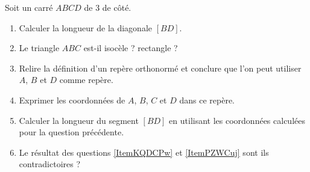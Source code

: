 
\begin{exercice}\label{exoSeconde-0085}

    Soit un carré \( ABCD\) de \unit{3}{\centi\meter} de côté.
    \begin{enumerate}
        \item   \label{ItemKQDCPw}
            Calculer la longueur de la diagonale \( [BD]\).
        \item
            Le triangle \( ABC\) est-il isocèle ? rectangle ?
        \item
            Relire la définition d'un repère orthonormé et conclure que l'on peut utiliser \( A\), \( B\) et \( D\) comme repère.
        \item
            Exprimer les coordonnées de \( A\), \( B\), \( C\) et \( D\) dans ce repère.
        \item   \label{ItemPZWCuj}
            Calculer la longueur du segment \( [BD]\) en utilisant les coordonnées calculées pour la question précédente.
        \item
            Le résultat des questions \ref{ItemKQDCPw} et \ref{ItemPZWCuj} sont ils contradictoires ?
    \end{enumerate}

\end{exercice}
